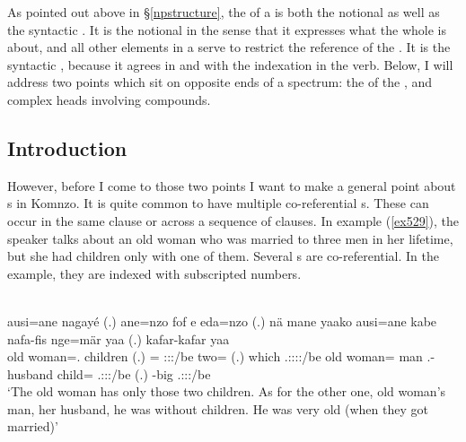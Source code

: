 As pointed out above in \S{}\ref{npstructure}, the  of a  is both the notional  as well as the syntactic . It is the notional  in the sense that it expresses what the whole  is about, and all other elements in a  serve to restrict the reference of the . It is the syntactic , because it agrees in  and  with the indexation in the verb. Below, I will address two points which sit on opposite ends of a spectrum: the  of the , and complex heads involving compounds.

\subsection{Introduction}

However, before I come to those two points I want to make a general point about s in Komnzo. It is quite common to have multiple co-referential s. These can occur in the same clause or across a sequence of clauses. In example (\ref{ex529}), the speaker talks about an old woman who was married to three men in her lifetime, but she had children only with one of them. Several s are co-referential. In the example, they are indexed with subscripted numbers.

\begin{exe}
	\\
	\gll ausi=ane nagayé (.) ane=nzo fof e eda=nzo (.) nä mane yaako ausi=ane kabe nafa-fis nge=mär yaa (.) kafar-kafar yaa\\
	{old woman=\Poss.\Sg} children (.) \Dem=\Only{} \Emph{} \Stdu:\Sbj:\Nonpast:\Ipfv/be two=\Only{} (.) \Indf{} which \Tsg.\Masc:\Sbj:\Pst:\Ipfv:\Andat/be {old woman=\Poss} man \Third.\Poss-husband child=\Priv{} \Tsg.\Masc:\Sbj:\Pst:\Ipfv/be (.) \Redup-big \Tsg.\Masc:\Sbj:\Pst:\Ipfv/be\\
	\trans `The old woman has only those two children. As for the other one, old woman's man, her husband, he was without children. He was very old (when they got married)'
	\label{ex529}
\end{exe}

